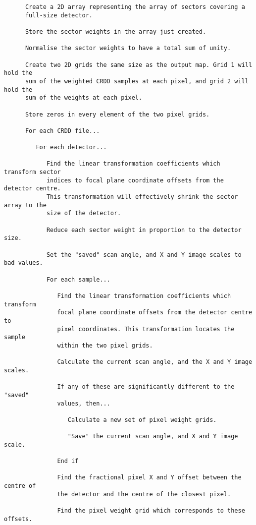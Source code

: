 \begin{verbatim}
      Create a 2D array representing the array of sectors covering a
      full-size detector.

      Store the sector weights in the array just created.

      Normalise the sector weights to have a total sum of unity.

      Create two 2D grids the same size as the output map. Grid 1 will hold the
      sum of the weighted CRDD samples at each pixel, and grid 2 will hold the
      sum of the weights at each pixel.

      Store zeros in every element of the two pixel grids.

      For each CRDD file...

         For each detector...

            Find the linear transformation coefficients which transform sector
            indices to focal plane coordinate offsets from the detector centre.
            This transformation will effectively shrink the sector array to the
            size of the detector.

            Reduce each sector weight in proportion to the detector size.

            Set the "saved" scan angle, and X and Y image scales to bad values.

            For each sample...

               Find the linear transformation coefficients which transform
               focal plane coordinate offsets from the detector centre to
               pixel coordinates. This transformation locates the sample
               within the two pixel grids.

               Calculate the current scan angle, and the X and Y image scales.

               If any of these are significantly different to the "saved"
               values, then...

                  Calculate a new set of pixel weight grids.

                  "Save" the current scan angle, and X and Y image scale.

               End if

               Find the fractional pixel X and Y offset between the centre of
               the detector and the centre of the closest pixel.

               Find the pixel weight grid which corresponds to these offsets.


\end{verbatim}

